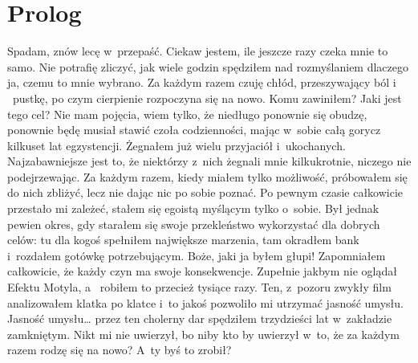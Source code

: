 \chapter{Prolog}

\begin{itquote}
Spadam, znów lecę w~przepaść. Ciekaw jestem, ile jeszcze razy czeka mnie to samo. Nie potrafię zliczyć, jak wiele 
godzin spędziłem nad rozmyślaniem dlaczego ja, czemu to mnie wybrano. Za każdym razem czuję chłód, przeszywający ból i
~pustkę, po czym cierpienie rozpoczyna się na nowo. Komu zawiniłem? Jaki jest tego cel? Nie mam pojęcia, wiem tylko, 
że niedługo ponownie się obudzę, ponownie będę musiał stawić czoła codzienności, mając w~sobie całą gorycz kilkuset 
lat egzystencji. Żegnałem już wielu przyjaciół i~ukochanych. Najzabawniejsze jest to, że niektórzy z~nich żegnali 
mnie kilkukrotnie, niczego nie podejrzewając. Za każdym razem, kiedy miałem tylko możliwość, próbowałem się do nich 
zbliżyć, lecz nie dając nic po sobie poznać. Po pewnym czasie całkowicie przestało mi zależeć, stałem się egoistą 
myślącym tylko o~sobie. Był jednak pewien okres, gdy starałem się swoje przekleństwo wykorzystać dla dobrych celów: 
tu dla kogoś spełniłem największe marzenia, tam okradłem bank i~rozdałem gotówkę potrzebującym. Boże, jaki ja byłem 
głupi! Zapomniałem całkowicie, że każdy czyn ma swoje konsekwencje. Zupełnie jakbym nie oglądał Efektu Motyla, a~
robiłem to przecież tysiące razy. Ten, z~pozoru zwykły film analizowałem klatka po klatce i~to jakoś pozwoliło mi 
utrzymać jasność umysłu. Jasność umysłu… przez ten cholerny dar spędziłem trzydzieści lat w~zakładzie zamkniętym. 
Nikt mi nie uwierzył, bo niby kto by uwierzył w~to, że za każdym razem rodzę się na nowo? A~ty byś to zrobił?
\end{itquote}
